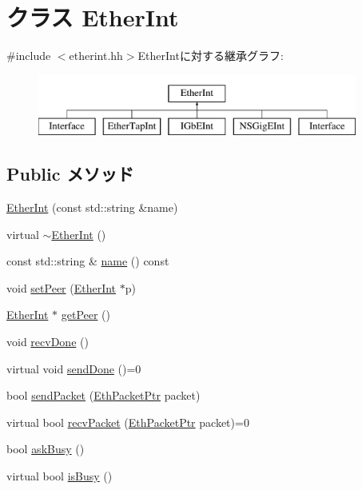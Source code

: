 \hypertarget{classEtherInt}{
\section{クラス EtherInt}
\label{classEtherInt}
}


{\ttfamily \#include $<$etherint.hh$>$}EtherIntに対する継承グラフ:\begin{figure}[H]
\begin{center}
\leavevmode
\includegraphics[height=2cm]{classEtherInt}
\end{center}
\end{figure}
\subsection*{Public メソッド}
\begin{DoxyCompactItemize}
\item 
\hyperlink{classEtherInt_a076ba043f9bbbbfde81da2f53aa4c66f}{EtherInt} (const std::string \&name)
\item 
virtual \hyperlink{classEtherInt_adeeb124d90321b0ab9d68d7832758b58}{$\sim$EtherInt} ()
\item 
const std::string \& \hyperlink{classEtherInt_a324e8c54c4c5161913681a1a52fef959}{name} () const 
\item 
void \hyperlink{classEtherInt_a12ec40007e0f314c816d25e64fb6daa3}{setPeer} (\hyperlink{classEtherInt}{EtherInt} $\ast$p)
\item 
\hyperlink{classEtherInt}{EtherInt} $\ast$ \hyperlink{classEtherInt_a756090fc7fcc4c15a50ad0bd817f5ba7}{getPeer} ()
\item 
void \hyperlink{classEtherInt_a5087bfa1bf938c500f8eb9d7c3e13eba}{recvDone} ()
\item 
virtual void \hyperlink{classEtherInt_a5a2f0c04ee61250a128bc992d2118390}{sendDone} ()=0
\item 
bool \hyperlink{classEtherInt_aad28edf890b463a29f87489b79f8b235}{sendPacket} (\hyperlink{classRefCountingPtr}{EthPacketPtr} packet)
\item 
virtual bool \hyperlink{classEtherInt_af3076ea966a2abda7735ea65e8a02034}{recvPacket} (\hyperlink{classRefCountingPtr}{EthPacketPtr} packet)=0
\item 
bool \hyperlink{classEtherInt_a85518aa8ebcb27030b04db3ae6cd8929}{askBusy} ()
\item 
virtual bool \hyperlink{classEtherInt_ae11cd8f177ca41a395ea873754cb5f9b}{isBusy} ()
\end{DoxyCompactItemize}
